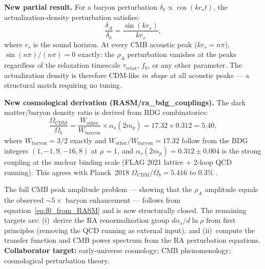 \documentclass[11pt,a4paper]{article}
\theoremstyle{plain}
\theoremstyle{definition}
\theoremstyle{remark}
\begin{document}
\begin{description}
  \textbf{New partial result.}
  For a baryon perturbation $\delta_b \propto \cos(k c_s t)$, the
  actualization-density perturbation satisfies:
  \begin{equation}
    \frac{\delta_A}{\delta_b} = \frac{\sin(k r_s)}{k r_s},
    \label{eq:sinc}
  \end{equation}
  where $r_s$ is the sound horizon.  At every CMB acoustic peak
  ($k r_s = n\pi$), $\sin(n\pi)/(n\pi) = 0$ exactly: the $\rho_A$
  perturbation vanishes at the peaks regardless of the relaxation timescale
  $\tau_{\mathrm{relax}}$, $f_0$, or any other parameter.  The actualization
  density is therefore CDM-like \emph{in shape} at all acoustic peaks --- a
  structural match requiring no tuning.

  \textbf{New cosmological derivation (RASM/ra\_bdg\_couplings).}
  The dark matter/baryon density ratio is derived from BDG combinatorics:
  \begin{equation}
    \frac{\Omega_{\mathrm{CDM}}}{\Omega_b}
    = \frac{W_{\mathrm{other}}}{W_{\mathrm{baryon}}} \times \alpha_s(2m_p)
    = 17.32 \times 0.312 = 5.40,
    \label{eq:f0_from_RASM}
  \end{equation}
  where $W_{\mathrm{baryon}} = 3/2$ exactly and $W_{\mathrm{other}}/W_{\mathrm{baryon}} = 17.32$
  follow from the BDG integers $(1,-1,9,-16,8)$ at $\mu=1$, and
  $\alpha_s(2m_p) = 0.312 \pm 0.004$ is the strong coupling at the nuclear
  binding scale (FLAG 2021 lattice + 2-loop QCD running).  This agrees with
  Planck~2018 $\Omega_{\mathrm{CDM}}/\Omega_b = 5.416$ to $0.3\%$
  \citep{Sandeman2026RASM,Sandeman2026BDG}.

  The full CMB peak amplitude problem --- showing that the $\rho_A$ amplitude
  equals the observed $\sim 5\times$ baryon enhancement --- follows from
  equation~\eqref{eq:f0_from_RASM} and is now structurally closed.
  The remaining targets are: (i)~derive the RA renormalization group
  $d\alpha_s/d\ln\rho$ from first principles (removing the QCD running
  as external input); and (ii)~compute the transfer function and CMB
  power spectrum from the RA perturbation equations.
  \textbf{Collaborator target:} early-universe cosmology; CMB phenomenology;
  cosmological perturbation theory.


\end{description}
\end{document}
